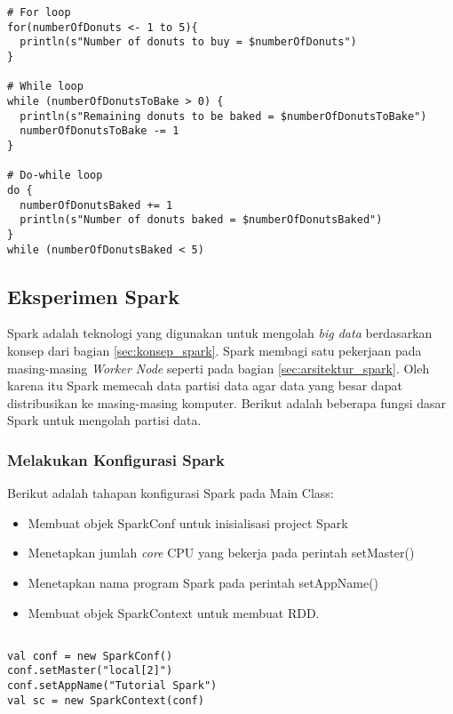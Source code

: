 \begin{lstlisting}[basicstyle=\ttfamily, frame=single,
	columns=fullflexible, keepspaces=true, breaklines=true, label=lst:perulangan, caption=Membuat Fungsi Perulangan pada Scala]
# For loop
for(numberOfDonuts <- 1 to 5){
  println(s"Number of donuts to buy = $numberOfDonuts")
}

# While loop
while (numberOfDonutsToBake > 0) {
  println(s"Remaining donuts to be baked = $numberOfDonutsToBake")
  numberOfDonutsToBake -= 1
}

# Do-while loop
do {
  numberOfDonutsBaked += 1
  println(s"Number of donuts baked = $numberOfDonutsBaked")
} 
while (numberOfDonutsBaked < 5)
\end{lstlisting}



\subsection{Eksperimen Spark}
Spark adalah teknologi yang digunakan untuk mengolah \textit{big data} berdasarkan konsep dari bagian \ref{sec:konsep_spark}. Spark membagi satu pekerjaan pada masing-masing \textit{Worker Node} seperti pada bagian \ref{sec:arsitektur_spark}. Oleh karena itu Spark memecah data partisi data agar data yang besar dapat distribusikan ke masing-masing komputer. Berikut adalah beberapa fungsi dasar Spark untuk mengolah partisi data.

\subsubsection{Melakukan Konfigurasi Spark}
Berikut adalah tahapan konfigurasi Spark pada Main Class:
\begin{itemize}
\item Membuat objek SparkConf untuk inisialisasi project Spark
\item Menetapkan jumlah \textit{core} CPU yang bekerja pada perintah setMaster()
\item Menetapkan nama program Spark pada perintah setAppName()
\item Membuat objek SparkContext untuk membuat RDD.

\end{itemize}

\begin{lstlisting}[basicstyle=\ttfamily, frame=single,
	columns=fullflexible, keepspaces=true, breaklines=true, label=ls_kepatuhan_1_1_1_logo_sharif_judge, caption=Konfigurasi Spark]
	
val conf = new SparkConf()
conf.setMaster("local[2]")
conf.setAppName("Tutorial Spark")
val sc = new SparkContext(conf)


\end{lstlisting}
  
